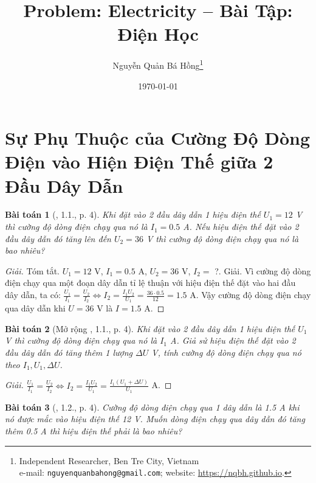 \documentclass{article}
\title{Problem: Electricity -- Bài Tập: Điện Học}
\author{Nguyễn Quản Bá Hồng\footnote{Independent Researcher, Ben Tre City, Vietnam\\e-mail: \texttt{nguyenquanbahong@gmail.com}; website: \url{https://nqbh.github.io}.}}
\date{\today}
\newtheorem{baitoan}{Bài toán}
\begin{document}
\maketitle
\begin{abstract}
	
\end{abstract}
\tableofcontents
\newpage


\section{Sự Phụ Thuộc của Cường Độ Dòng Điện vào Hiện Điện Thế giữa 2 Đầu Dây Dẫn}

\begin{baitoan}[\cite{SBT_Vat_Ly_9}, 1.1., p. 4]
	Khi đặt vào 2 đầu dây dẫn 1 hiệu điện thế $U_1 = 12$ \emph{V} thì cường độ dòng điện chạy qua nó là $I_1 = 0.5$ \emph{A}. Nếu hiệu điện thế đặt vào 2 đầu dây dẫn đó tăng lên đến $U_2 = 36$ \emph{V} thì cường độ dòng điện chạy qua nó là bao nhiêu?
\end{baitoan}

\begin{proof}[Giải]
	\textsf{Tóm tắt.} $U_1 = 12$ V, $I_1 = 0.5$ A, $U_2 = 36$ V, $I_2 =$ ?. \textsf{Giải.} Vì cường độ dòng điện chạy qua một đoạn dây dẫn tỉ lệ thuận với hiệu điện thế đặt vào hai đầu dây dẫn, ta có: $\frac{U_1}{I_1} = \frac{U_2}{I_2}\Leftrightarrow I_2 = \frac{I_1U_2}{U_1} = \frac{36\cdot0.5}{12} = 1.5$ A. Vậy cường độ dòng điện chạy qua dây dẫn khi $U = 36$ V là $I = 1.5$ A.
\end{proof}

\begin{baitoan}[Mở rộng \cite{SBT_Vat_Ly_9}, 1.1., p. 4]
	Khi đặt vào 2 đầu dây dẫn 1 hiệu điện thế $U_1$ \emph{V} thì cường độ dòng điện chạy qua nó là $I_1$ \emph{A}. Giả sử hiệu điện thế đặt vào 2 đầu dây dẫn đó tăng thêm 1 lượng $\Delta U$ \emph{V}, tính cường độ dòng điện chạy qua nó theo $I_1,U_1,\Delta U$.
\end{baitoan}

\begin{proof}[Giải]
	$\frac{U_1}{I_1} = \frac{U_2}{I_2}\Leftrightarrow I_2 = \frac{I_1U_2}{U_1} = \frac{I_1(U_1 + \Delta U)}{U_1}$ A.
\end{proof}

\begin{baitoan}[\cite{SBT_Vat_Ly_9}, 1.2., p. 4]
	Cường độ dòng điện chạy qua 1 dây dẫn là \emph{1.5 A} khi nó được mắc vào hiệu điện thế \emph{12 V}. Muốn dòng điện chạy qua dây dẫn đó tăng thêm \emph{0.5 A} thì hiệu điện thế phải là bao nhiêu?
\end{baitoan}
\end{document}
